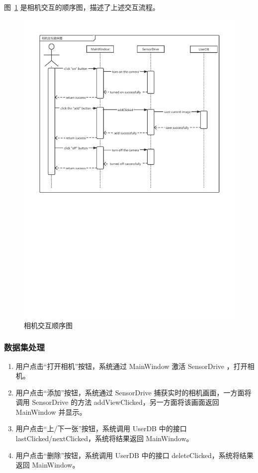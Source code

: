图~\ref{fig:cameraSD} 是相机交互的顺序图，描述了上述交互流程。

\begin{figure}[htbp]
	\centering
	\includegraphics[width=0.85\linewidth]{figures/cameraSD.pdf}
	\caption{相机交互顺序图}
	\label{fig:cameraSD}
\end{figure}

\subsubsection{数据集处理}

\begin{enumerate}
	\item 用户点击“打开相机”按钮，系统通过 MainWindow 激活 SensorDrive ，打开相机。
	
	\item 用户点击“添加”按钮，系统通过 SensorDrive 捕获实时的相机画面，一方面将调用 SensorDrive 的方法 addViewClicked，另一方面将该画面返回 MainWindow 并显示。
	
	\item 用户点击“上/下一张”按钮，系统调用 UserDB 中的接口 lastClicked/nextClicked，系统将结果返回 MainWindow。
	
	\item 用户点击“删除”按钮，系统调用 UserDB 中的接口 deleteClicked，系统将结果返回 MainWindow。
\end{enumerate}

